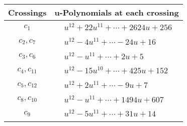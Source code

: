 \documentclass[1p]{elsarticle_modified}
\theoremstyle{definition}
\begin{document}
\begin{tabular}{m{50pt}|m{274pt}}
Crossings & \hspace{64pt}u-Polynomials at each crossing \\
\hline $$\begin{aligned}c_{1}\end{aligned}$$&$\begin{aligned}
&u^{12}+22 u^{11}+\cdots+2624 u+256
\end{aligned}$\\
\hline $$\begin{aligned}c_{2},c_{7}\end{aligned}$$&$\begin{aligned}
&u^{12}-4 u^{11}+\cdots-24 u+16
\end{aligned}$\\
\hline $$\begin{aligned}c_{3},c_{6}\end{aligned}$$&$\begin{aligned}
&u^{12}- u^{11}+\cdots+2 u+5
\end{aligned}$\\
\hline $$\begin{aligned}c_{4},c_{11}\end{aligned}$$&$\begin{aligned}
&u^{12}-15 u^{10}+\cdots+425 u+152
\end{aligned}$\\
\hline $$\begin{aligned}c_{5},c_{12}\end{aligned}$$&$\begin{aligned}
&u^{12}+2 u^{11}+\cdots-9 u+7
\end{aligned}$\\
\hline $$\begin{aligned}c_{8},c_{10}\end{aligned}$$&$\begin{aligned}
&u^{12}- u^{11}+\cdots+1494 u+607
\end{aligned}$\\
\hline $$\begin{aligned}c_{9}\end{aligned}$$&$\begin{aligned}
&u^{12}-5 u^{11}+\cdots+31 u+14
\end{aligned}$\\
\hline
\end{tabular}\\~\\
\newpage\renewcommand{\arraystretch}{1}
\end{document}
